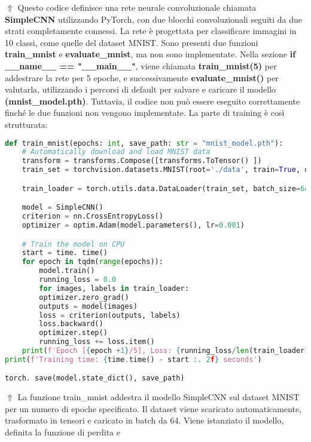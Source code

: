 \documentclass[a4paper,12pt]{article}
\begin{document}
$\Uparrow$ Questo codice definisce una rete neurale convoluzionale chiamata \textbf{SimpleCNN} utilizzando PyTorch, con due blocchi convoluzionali seguiti da due strati completamente connessi. La rete è progettata per classificare immagini in 10 classi, come quelle del dataset MNIST. Sono presenti due funzioni \textbf{train\_mnist} e \textbf{evaluate\_mnist}, ma non sono implementate. Nella sezione \textbf{if \_\_name\_\_ == "\_\_main\_\_"}, viene chiamata \textbf{train\_mnist(5)} per addestrare la rete per 5 epoche, e successivamente \textbf{evaluate\_mnist()} per valutarla, utilizzando i percorsi di default per salvare e caricare il modello \textbf{(mnist\_model.pth)}. Tuttavia, il codice non può essere eseguito correttamente finché le due funzioni non vengono implementate.
\newline 
\newline
La parte di training è così strutturata: 
\begin{lstlisting}[language=Python, basicstyle=\ttfamily\footnotesize, breaklines=true, frame=single]
def train_mnist(epochs: int, save_path: str = "mnist_model.pth"):
    # Automatically download and load MNIST data
    transform = transforms.Compose([transforms.ToTensor() ])
    train_set = torchvision.datasets.MNIST(root='./data', train=True, download=True, transform=transform)

    train_loader = torch.utils.data.DataLoader(train_set, batch_size=64, shuffle=True)

    model = SimpleCNN()
    criterion = nn.CrossEntropyLoss()
    optimizer = optim.Adam(model.parameters(), lr=0.001)

    # Train the model on CPU
    start = time. time()
    for epoch in tqdm(range(epochs)):
        model.train()
        running_loss = 0.0
        for images, labels in train_loader:
        optimizer.zero_grad()
        outputs = model(images)
        loss = criterion(outputs, labels)
        loss.backward()
        optimizer.step()
        running_loss += loss.item()
    print(f'Epoch [{epoch +1}/5], Loss: {running_loss/len(train_loader) :. 4f}')
print(f'Training time: {time.time() - start :. 2f} seconds')

torch. save(model.state_dict(), save_path)
\end{lstlisting}
$\Uparrow$ La funzione train\_mnist addestra il modello SimpleCNN sul 
dataset MNIST per un numero di epoche specificato. 
Il dataset viene scaricato automaticamente, 
trasformato in tensori e caricato in batch da 64. 
Viene istanziato il modello, definita la funzione di perdita e 
\end{document}
